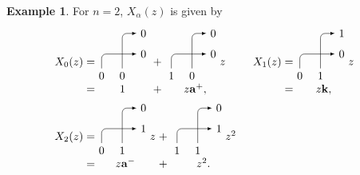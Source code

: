 \documentclass[11pt]{article}
\theoremstyle{definition}
\newtheorem{exam}[theo]{Example}
\numberwithin{equation}{section}
\newcommand{\aaa}{\mathbf{a}}
\newcommand{\kk}{\mathbf{k}}
\begin{document}
\begin{exam}\label{a:ex:X}
For $n=2$, $X_\alpha(z)$ is given by
\begin{align*}
\raisebox{-1pt}{$X_0(z)$} & \begin{array}{@{\;=}c@{\;+\;}c} \begin{tikzpicture}[scale=.65,>=latex,rounded corners,baseline=-1cm,rotate=-90]
\draw[->] (1.7,0) node[anchor=north] {$0$} -- (0,0) -- (0,0.7) node[anchor=west] {$0$};
\draw[->] (1.7,-1) node[anchor=north] {$0$} -- (1,-1) -- (1,0.7) node[anchor=west] {$0$};
\end{tikzpicture}
& \begin{tikzpicture}[scale=.65,>=latex,rounded corners,baseline=-1cm,rotate=-90]
\draw[->] (1.7,0) node[anchor=north] {$0$} -- (0,0) -- (0,0.7) node[anchor=west] {$0$};
\draw[->] (1.7,-1) node[anchor=north] {$1$} -- (1,-1) -- (1,0.7) node[anchor=west] {$0$};
\end{tikzpicture}
z
\\
1 & z \aaa^+,
\end{array}
%
&
%
\raisebox{-1pt}{$X_1(z)$} & \begin{array}{@{\;=}c} \begin{tikzpicture}[scale=.65,>=latex,rounded corners,baseline=-1cm,rotate=-90]
\draw[->] (1.7,0) node[anchor=north] {$1$} -- (0,0) -- (0,0.7) node[anchor=west] {$1$};
\draw[->] (1.7,-1) node[anchor=north] {$0$} -- (1,-1) -- (1,0.7) node[anchor=west] {$0$};
\end{tikzpicture}
z
\\
z \kk,
\end{array}
%
\\
%
\raisebox{-1pt}{$X_2(z)$} & \begin{array}{@{\;=}c@{\;+\;}c} \begin{tikzpicture}[scale=.65,>=latex,rounded corners,baseline=-1cm,rotate=-90]
\draw[->] (1.7,0) node[anchor=north] {$1$} -- (0,0) -- (0,0.7) node[anchor=west] {$0$};
\draw[->] (1.7,-1) node[anchor=north] {$0$} -- (1,-1) -- (1,0.7) node[anchor=west] {$1$};
\end{tikzpicture}
z
& \begin{tikzpicture}[scale=.65,>=latex,rounded corners,baseline=-1cm,rotate=-90]
\draw[->] (1.7,0) node[anchor=north] {$1$} -- (0,0) -- (0,0.7) node[anchor=west] {$0$};
\draw[->] (1.7,-1) node[anchor=north] {$1$} -- (1,-1) -- (1,0.7) node[anchor=west] {$1$};
\end{tikzpicture}
z^2
\\
z \aaa^- & z^2.
\end{array}

\end{align*}
\end{exam}
\end{document}
